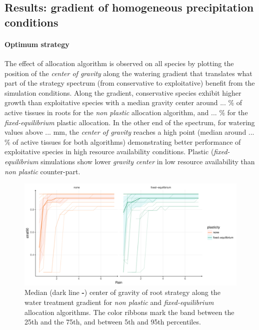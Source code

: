 \subsection{Results: gradient of homogeneous precipitation conditions}

\paragraph{Optimum strategy}

The effect of allocation algorithm is observed on all species by plotting the position of the \textit{center of gravity} along the watering gradient that translates what part of the strategy spectrum (from conservative to exploitative) benefit from the simulation conditions. Along the gradient, conservative species exhibit higher growth than exploitative species with a median gravity center around ... \% of active tissues in roots for the \textit{non plastic} allocation algorithm, and ... \% for the \textit{fixed-equilibrium} plastic allocation. In the other end of the spectrum, for watering values above ... mm, the \textit{center of gravity} reaches a high point (median around ... \% of active tissues for both algorithms) demonstrating better performance of exploitative species in high resource availability conditions. Plastic (\textit{fixed-equilibrium} simulations show lower \textit{gravity center} in low resource availability than \textit{non plastic} counter-part. 


\begin{figure}\label{fig:gradient_optimum_strat}
\includegraphics[width = \textwidth]{./2_PP/Figures/Rain/best_strat_pl_rain_grad_alt.pdf}
\caption{Median (dark line \textbf{-}) center of gravity of root strategy along the water treatment gradient for \textcolor{myOrange}{\textit{non plastic}} and \textcolor{myGreen}{\textit{fixed-equilibrium}} allocation algorithms. The color ribbons mark the band between the 25th and the 75th, and between 5th and 95th percentiles.} %
\end{figure}

